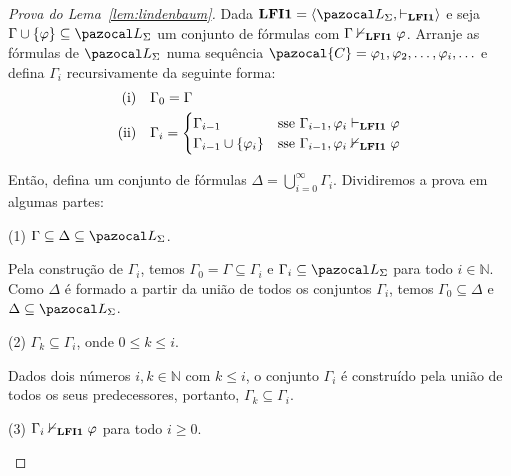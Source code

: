         \begin{proof}[Prova do Lema~\ref{lem:lindenbaum}]
            Dada $\lfium{} = \langle \ling, \conhil \rangle$ e seja $\Gamma \cup \{\phi\} \subseteq \ling$ um conjunto de fórmulas com $\Gamma \nvdash_{{\normalfont\textbf{LFI1}}{}} \varphi$. Arranje as fórmulas de $\ling$ numa sequência $\pazocal{C} = \phi_1, \phi_2, \ldots, \phi_i, \ldots$ e defina $\Gamma_i$ recursivamente da seguinte forma:
            \begin{align*}
                    \text{(i)}\quad&\Gamma_0 = \Gamma\\
                    \text{(ii)}\quad&\Gamma_i =
                    \begin{cases}
                        \Gamma_{i - 1} &\text{sse}~ \Gamma_{i - 1}, \varphi_i \vdash_{{\normalfont\textbf{LFI1}}{}} \varphi\\
                        \Gamma_{i - 1} \cup \{\varphi_i\} &\text{sse}~ \Gamma_{i - 1}, \varphi_i \nvdash_{{\normalfont\textbf{LFI1}}{}} \varphi
                    \end{cases}
            \end{align*}

            Então, defina um conjunto de fórmulas $\Delta = \bigcup_{i=0}^{\infty}\Gamma_i$. Dividiremos a prova em algumas partes:
            
            \begin{adjustwidth}{1cm}{}
                \noindent(1) $\Gamma \subseteq \Delta \subseteq \ling$.

                \begin{adjustwidth}{1cm}{}
                    Pela construção de $\Gamma_i$, temos $\Gamma_0 = \Gamma \subseteq \Gamma_i$ e $\Gamma_i \subseteq \ling$ para todo $i \in \mathbb{N}$. Como $\Delta$ é formado a partir da união de todos os conjuntos $\Gamma_i$, temos $\Gamma_0 \subseteq \Delta$ e $\Delta \subseteq \ling$.
                \end{adjustwidth}

                \noindent(2) $\Gamma_k \subseteq \Gamma_i$, onde $0 \leq k \leq i$.

                \begin{adjustwidth}{1cm}{}
                    Dados dois números $i, k \in \mathbb{N}$ com $k \leq i$, o conjunto $\Gamma_i$ é construído pela união de todos os seus predecessores, portanto, $\Gamma_k \subseteq \Gamma_i$.
                    
                \end{adjustwidth}

                \noindent(3) $\Gamma_i \nvdash_{{\normalfont\textbf{LFI1}}{}} \varphi$ para todo $i \geq 0$.


\end{adjustwidth}
\end{proof}
